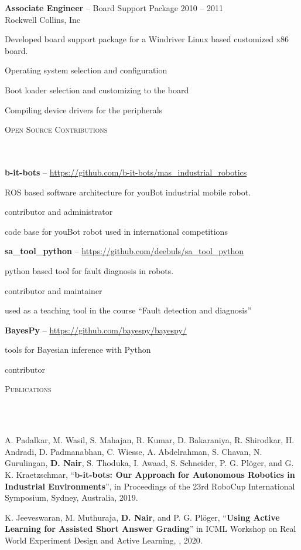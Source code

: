 \documentclass{article}
\newcommand{\header}[1]{{
\hspace*{-15pt}\vspace*{6pt} \textsc{#1}} \vspace*{-6pt} 
\lineunder
}
\newcommand{\lineunder}{
\vspace*{-8pt} \\ \hspace*{-18pt} 
\hrulefill \\
}
\newcommand{\employer}[4]{{
\vspace*{2pt}%
\textbf{#1} #2 \hfill #3\\ #4 \vspace*{2pt}}
}
\renewcommand{\labelitemii}{
$\vcenter{\hbox{\tiny$\bullet$}}$\hspace*{-3pt}
}
\newenvironment{bullet-list-major}{
\begin{list}{\labelitemii}{\setlength\leftmargin{3pt} 
\topsep 0pt \itemsep -2pt}}{\vspace*{4pt}\end{list}
}
\newenvironment{bullet-list-minor}{
\begin{list}{\labelitemii}{\setlength\leftmargin{15pt} 
\topsep 0pt \itemsep -2pt}}{\vspace*{4pt}\end{list}
}
\begin{document}
    \employer{Associate Engineer}{-- Board Support Package}{2010 -- 2011}
    {Rockwell Collins, Inc}
    \begin{bullet-list-minor}
    \item Developed board support package for a Windriver Linux based customized x86 board.
    \item Operating system selection and configuration 
    \item Boot loader selection and customizing to the board 
    \item Compiling device drivers for the peripherals 
    \end{bullet-list-minor}
    
\vspace*{4pt}%
\header{Open Source Contributions}

\employer{b-it-bots}{-- \url{https://github.com/b-it-bots/mas\_industrial\_robotics}}{}{}
\begin{bullet-list-minor}
    \item ROS based software architecture for youBot industrial mobile robot.
    \item contributor and administrator
    \item code base for youBot robot used in international competitions
\end{bullet-list-minor}
\employer{sa\_tool\_python}{-- \url{https://github.com/deebuls/sa_tool_python} }{}
    {}
    \begin{bullet-list-minor}
    \item python based tool for fault diagnosis in robots.
    \item contributor and maintainer
    \item used as a teaching tool in the course ``Fault detection and diagnosis''
    \end{bullet-list-minor}

\employer{BayesPy}{-- \url{https://github.com/bayespy/bayespy/}}{}{}    
    \begin{bullet-list-minor}
    \item tools for Bayesian inference with Python
    \item contributor
    \end{bullet-list-minor}
    
  
\vspace*{4pt}%
\header{Publications}
\begin{bullet-list-major}
 \item A. Padalkar, M. Wasil, S. Mahajan, R. Kumar, D. Bakaraniya, R. Shirodkar, H. Andradi, D. Padmanabhan, C. Wiesse, A. Abdelrahman, S. Chavan, N. Gurulingan, \textbf{D. Nair}, S. Thoduka, I. Awaad, S. Schneider, P. G. Pl\"{o}ger, and G. K. Kraetzschmar, ``\textbf{b-it-bots: Our Approach for Autonomous Robotics in Industrial Environments}'', in Proceedings of the 23rd RoboCup International Symposium, Sydney, Australia, 2019. 
 \item K. Jeeveswaran, M. Muthuraja, \textbf{D. Nair}, and P. G. Pl\"{o}ger, ``\textbf{Using Active Learning for Assisted Short Answer Grading}'' in ICML Workshop on Real World Experiment Design and Active Learning, , 2020. 
\end{bullet-list-major}
\end{document}
